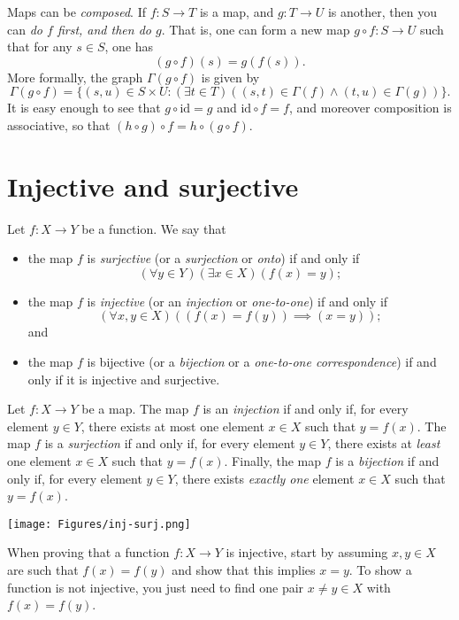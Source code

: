 \documentclass[11pt,dvipsnames]{book}
\numberwithin{equation}{section} %
\numberwithin{figure}{section} %
\numberwithin{table}{section} %
\begin{document}
Maps can be \emph{composed}.
If $f\colon S \to T$ is a map, and $g\colon T \to U$ is another, then you can \emph{do $f$ first, and then do $g$}.
That is, one can form a new map $g\circ f\colon S \to U$ such that for any $s\in S$, one has
\[
	(g\circ f)(s)= g(f(s)) .
\]
More formally, the graph $\Gamma(g\circ f)$ is given by
\[
	\Gamma(g\circ f)=\{(s,u)\in S\times U : (\exists t\in T)((s,t)\in\Gamma(f)\wedge(t,u)\in\Gamma(g))\}.
\]
It is easy enough to see that $g\circ\mathrm{id}=g$ and $\mathrm{id}\circ f=f$, and moreover composition is associative, so that $(h\circ g)\circ f=h\circ(g\circ f)$.

\section{Injective and surjective}

\begin{definition}
Let $f \colon X\rightarrow Y$ be a function. We say that
\begin{itemize}
\item the map $f$ is \emph{surjective} (or a \emph{surjection} or \emph{onto}) if and only if
\[
(\forall y\in Y)(\exists x\in X)(f(x)=y);
\]
 
\item the map $f$ is \emph{injective} (or an \emph{injection} or \emph{one-to-one}) if and only if
\[
(\forall x,y\in X)((f(x)=f(y)) \implies (x=y));
\]
and

\item the map $f$ is bijective (or a \emph{bijection} or a \emph{one-to-one correspondence}) if and only if it is injective and surjective.
\end{itemize}
\end{definition}

Let $f \colon X \to Y$ be a map.
The map $f$ is an \emph{injection} if and only if, for every element $y \in Y$, there exists at most one element $x \in X$ such that $y =f(x)$.
The map $f$ is a \emph{surjection} if and only if, for every element $y \in Y$, there exists at \emph{least} one element $x \in X$ such that $y = f(x)$.
Finally, the map $f$ is a \emph{bijection} if and only if, for every element $y\in Y$, there exists \emph{exactly one} element $x \in X $ such that $y = f(x)$.
 
\begin{center}
\texttt{[image: Figures/inj-surj.png]}
\end{center}

\begin{protip}
When proving that a function $f:X\rightarrow Y$ is injective, start by assuming $x,y\in X$ are such that $f(x)=f(y)$ and show that this implies $x=y$. To show a function is not injective, you just need to find one pair $x\neq y\in X$ with $f(x)=f(y)$.
\end{protip}
\end{document}
